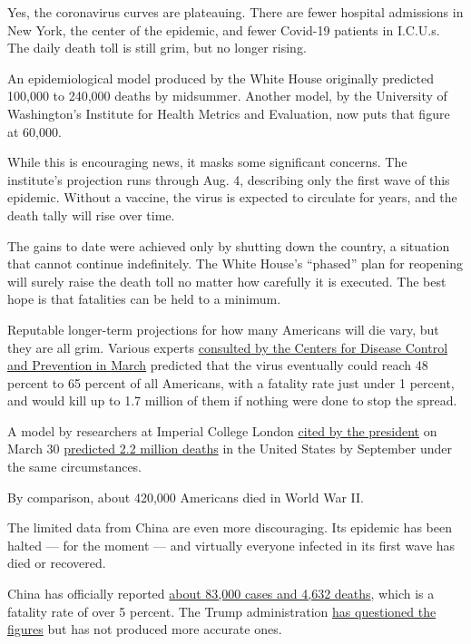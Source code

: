 Yes, the coronavirus curves are plateauing. There are fewer hospital
admissions in New York, the center of the epidemic, and fewer Covid-19
patients in I.C.U.s. The daily death toll is still grim, but no longer
rising.

An epidemiological model produced by the White House originally
predicted 100,000 to 240,000 deaths by midsummer. Another model, by the
University of Washington's Institute for Health Metrics and Evaluation,
now puts that figure at 60,000.

While this is encouraging news, it masks some significant concerns. The
institute's projection runs through Aug. 4, describing only the first
wave of this epidemic. Without a vaccine, the virus is expected to
circulate for years, and the death tally will rise over time.

The gains to date were achieved only by shutting down the country, a
situation that cannot continue indefinitely. The White House's
``phased'' plan for reopening will surely raise the death toll no matter
how carefully it is executed. The best hope is that fatalities can be
held to a minimum.

Reputable longer-term projections for how many Americans will die vary,
but they are all grim. Various experts
\href{https://www.nytimes3xbfgragh.onion/2020/03/13/us/coronavirus-deaths-estimate.html}{consulted
by the Centers for Disease Control and Prevention in March} predicted
that the virus eventually could reach 48 percent to 65 percent of all
Americans, with a fatality rate just under 1 percent, and would kill up
to 1.7 million of them if nothing were done to stop the spread.

A model by researchers at Imperial College London
\href{https://www.whitehouse.gov/briefings-statements/remarks-president-trump-vice-president-pence-members-coronavirus-task-force-press-briefing-14/}{cited
by the president} on March 30
\href{https://www.imperial.ac.uk/media/imperial-college/medicine/sph/ide/gida-fellowships/Imperial-College-COVID19-NPI-modelling-16-03-2020.pdf}{predicted
2.2 million deaths} in the United States by September under the same
circumstances.

By comparison, about 420,000 Americans died in World War II.

The limited data from China are even more discouraging. Its epidemic has
been halted --- for the moment --- and virtually everyone infected in
its first wave has died or recovered.

China has officially reported
\href{https://www.worldometers.info/coronavirus/}{about 83,000 cases and
4,632 deaths}, which is a fatality rate of over 5 percent. The Trump
administration
\href{https://www.nytimes3xbfgragh.onion/2020/04/02/us/politics/cia-coronavirus-china.html}{has
questioned the figures} but has not produced more accurate ones.


